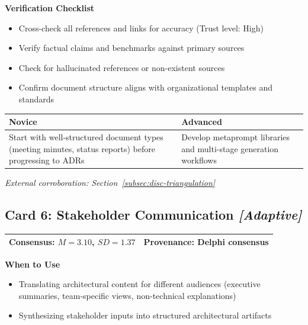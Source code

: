 \textbf{Verification Checklist}
\begin{itemize}[label=\checkbox]
    \item Cross-check all references and links for accuracy (Trust level: High)
    \item Verify factual claims and benchmarks against primary sources
    \item Check for hallucinated references or non-existent sources
    \item Confirm document structure aligns with organizational templates and standards
\end{itemize}

\begin{tabular}{|p{6.5cm}|p{6.5cm}|}
    \hline
    \textbf{Novice} & \textbf{Advanced} \\
    \hline
    Start with well-structured document types (meeting minutes, status reports) before progressing to ADRs & Develop metaprompt libraries and multi-stage generation workflows \\
    \hline
\end{tabular}

\vspace{0.5em}
\textit{External corroboration: Section~\ref{subsec:disc-triangulation}}

\clearpage
\subsection*{Card 6: Stakeholder Communication \hfill \textit{[Adaptive]}}

\begin{tabular}{|p{7cm}|p{6cm}|}
    \hline
    \textbf{Consensus:} $M = 3.10$, $SD = 1.37$ & \textbf{Provenance:} Delphi consensus \\
    \hline
\end{tabular}

\vspace{0.5em}
\textbf{When to Use}
\begin{itemize}
    \item Translating architectural content for different audiences (executive summaries, team-specific views, non-technical explanations)
    \item Synthesizing stakeholder inputs into structured architectural artifacts
\end{itemize}

